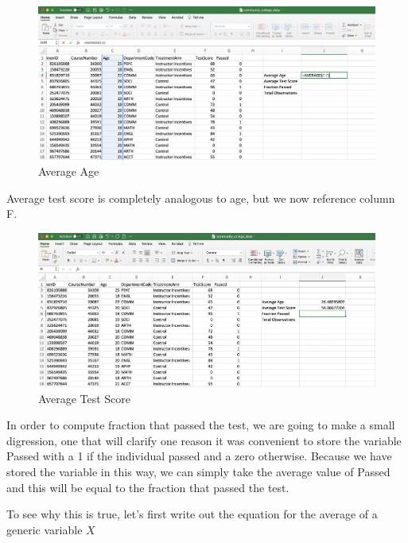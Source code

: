 \documentclass[
]{book}
\begin{document}
\begin{figure}

{\centering \includegraphics[width=1\linewidth]{images/01_sumstats2} 

}

\caption{Average Age}\label{fig:sumstats2}
\end{figure}

Average test score is completely analogous to age, but we now reference column F.

\begin{figure}

{\centering \includegraphics[width=1\linewidth]{images/01_sumstats3} 

}

\caption{Average Test Score}\label{fig:sumstats3}
\end{figure}

In order to compute fraction that passed the test, we are going to make a small digression, one that will clarify one reason it was convenient to store the variable Passed with a 1 if the individual passed and a zero otherwise. Because we have stored the variable in this way, we can simply take the average value of Passed and this will be equal to the fraction that passed the test.

To see why this is true, let's first write out the equation for the average of a generic variable \(X\)
\end{document}
